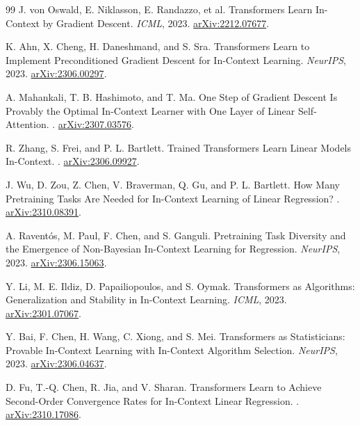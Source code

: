 \documentclass[11pt,a4paper]{article}
\begin{document}
\begin{thebibliography}{99}
J. von Oswald, E. Niklasson, E. Randazzo, et al.
\newblock Transformers Learn In-Context by Gradient Descent.
\newblock \emph{ICML}, 2023. \href{https://arxiv.org/abs/2212.07677}{arXiv:2212.07677}.

K. Ahn, X. Cheng, H. Daneshmand, and S. Sra.
\newblock Transformers Learn to Implement Preconditioned Gradient Descent for In-Context Learning.
\newblock \emph{NeurIPS}, 2023. \href{https://arxiv.org/abs/2306.00297}{arXiv:2306.00297}.

A. Mahankali, T. B. Hashimoto, and T. Ma.
\newblock One Step of Gradient Descent Is Provably the Optimal In-Context Learner with One Layer of Linear Self-Attention.
. \href{https://arxiv.org/abs/2307.03576}{arXiv:2307.03576}.

R. Zhang, S. Frei, and P. L. Bartlett.
\newblock Trained Transformers Learn Linear Models In-Context.
. \href{https://arxiv.org/abs/2306.09927}{arXiv:2306.09927}.

J. Wu, D. Zou, Z. Chen, V. Braverman, Q. Gu, and P. L. Bartlett.
\newblock How Many Pretraining Tasks Are Needed for In-Context Learning of Linear Regression?
. \href{https://arxiv.org/abs/2310.08391}{arXiv:2310.08391}.

A. Raventós, M. Paul, F. Chen, and S. Ganguli.
\newblock Pretraining Task Diversity and the Emergence of Non-Bayesian In-Context Learning for Regression.
\newblock \emph{NeurIPS}, 2023. \href{https://arxiv.org/abs/2306.15063}{arXiv:2306.15063}.

Y. Li, M. E. Ildiz, D. Papailiopoulos, and S. Oymak.
\newblock Transformers as Algorithms: Generalization and Stability in In-Context Learning.
\newblock \emph{ICML}, 2023. \href{https://arxiv.org/abs/2301.07067}{arXiv:2301.07067}.

Y. Bai, F. Chen, H. Wang, C. Xiong, and S. Mei.
\newblock Transformers as Statisticians: Provable In-Context Learning with In-Context Algorithm Selection.
\newblock \emph{NeurIPS}, 2023. \href{https://arxiv.org/abs/2306.04637}{arXiv:2306.04637}.

D. Fu, T.-Q. Chen, R. Jia, and V. Sharan.
\newblock Transformers Learn to Achieve Second-Order Convergence Rates for In-Context Linear Regression.
. \href{https://arxiv.org/abs/2310.17086}{arXiv:2310.17086}.


\end{thebibliography}
\end{document}
